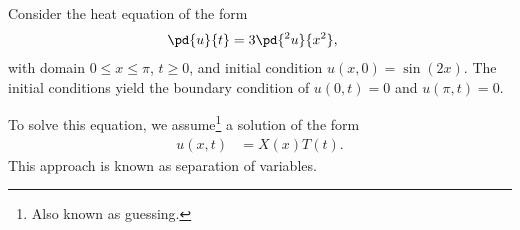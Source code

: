 \documentclass[10pt]{mypackage}
\begin{document}
\begin{example}
  Consider the heat equation of the form
  \begin{align*}
    \pd{u}{t} &= 3\pd{^2u}{x^2},
  \end{align*}
  with domain $0\leq x \leq \pi$, $t\geq 0$, and initial condition $u\left( x,0 \right) = \sin\left(2x\right)$. The initial conditions yield the boundary condition of $u\left( 0,t \right) = 0$ and $u\left( \pi,t \right) = 0$.\newline

  To solve this equation, we assume\footnote{Also known as guessing.} a solution of the form
  \begin{align*}
    u\left( x,t \right) &= X(x)T(t).
  \end{align*}
  This approach is known as separation of variables.\newline


\end{example}
\end{document}
